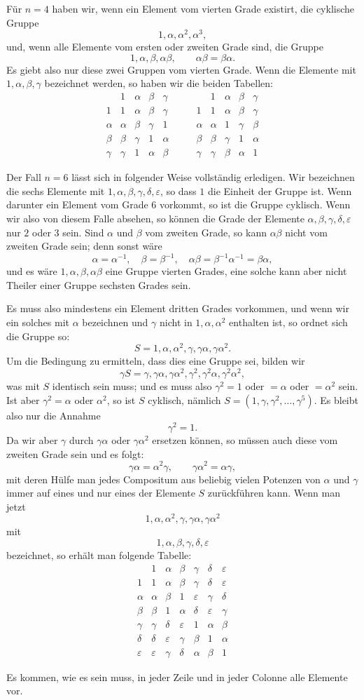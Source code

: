 \documentclass[11pt]{article}
\newcommand{\orderFourTables}{%
\[
\begin{array}{c|cccc}
 &1&\alpha&\beta&\gamma\\\hline
1&1&\alpha&\beta&\gamma\\
\alpha&\alpha&\beta&\gamma&1\\
\beta&\beta&\gamma&1&\alpha\\
\gamma&\gamma&1&\alpha&\beta
\end{array}
\qquad
\begin{array}{c|cccc}
 &1&\alpha&\beta&\gamma\\\hline
1&1&\alpha&\beta&\gamma\\
\alpha&\alpha&1&\gamma&\beta\\
\beta&\beta&\gamma&1&\alpha\\
\gamma&\gamma&\beta&\alpha&1
\end{array}
\]
}
\newcommand{\orderSixTable}{%
\[
\begin{array}{c|cccccc}
&1&\alpha&\beta&\gamma&\delta&\varepsilon\\\hline
1&1&\alpha&\beta&\gamma&\delta&\varepsilon\\
\alpha&\alpha&\beta&1&\varepsilon&\gamma&\delta\\
\beta&\beta&1&\alpha&\delta&\varepsilon&\gamma\\
\gamma&\gamma&\delta&\varepsilon&1&\alpha&\beta\\
\delta&\delta&\varepsilon&\gamma&\beta&1&\alpha\\
\varepsilon&\varepsilon&\gamma&\delta&\alpha&\beta&1
\end{array}
\]
}
\begin{document}
Für $n=4$ haben wir, wenn ein Element vom vierten Grade existirt, die cyklische Gruppe
\[
1,\alpha,\alpha^2,\alpha^3,
\]
und, wenn alle Elemente vom ersten oder zweiten Grade sind, die Gruppe
\[
1,\alpha,\beta,\alpha\beta,
\qquad \alpha\beta=\beta\alpha.
\]
Es giebt also nur diese zwei Gruppen vom vierten Grade. Wenn die Elemente mit $1,\alpha,\beta,\gamma$ bezeichnet werden, so haben wir die beiden Tabellen:
\orderFourTables

Der Fall $n=6$ lässt sich in folgender Weise vollständig erledigen. Wir bezeichnen die sechs Elemente mit $1,\alpha,\beta,\gamma,\delta,\varepsilon$, so dass $1$ die Einheit der Gruppe ist. Wenn darunter ein Element vom Grade $6$ vorkommt, so ist die Gruppe cyklisch. Wenn wir also von diesem Falle absehen, so können die Grade der Elemente $\alpha,\beta,\gamma,\delta,\varepsilon$ nur $2$ oder $3$ sein. Sind $\alpha$ und $\beta$ vom zweiten Grade, so kann $\alpha\beta$ nicht vom zweiten Grade sein; denn sonst wäre
\[
\alpha=\alpha^{-1},\quad \beta=\beta^{-1},\quad \alpha\beta=\beta^{-1}\alpha^{-1}=\beta\alpha,
\]
und es wäre $1,\alpha,\beta,\alpha\beta$ eine Gruppe vierten Grades, eine solche kann aber nicht Theiler einer Gruppe sechsten Grades sein.

Es muss also mindestens ein Element dritten Grades vorkommen, und wenn wir ein solches mit $\alpha$ bezeichnen und $\gamma$ nicht in $1,\alpha,\alpha^2$ enthalten ist, so ordnet sich die Gruppe so:
\begin{equation}
S=1,\alpha,\alpha^2,\gamma,\gamma\alpha,\gamma\alpha^2.
\tag{1}
\end{equation}
Um die Bedingung zu ermitteln, dass dies eine Gruppe sei, bilden wir
\[
\gamma S=\gamma,\gamma\alpha,\gamma\alpha^2,\gamma^2,\gamma^2\alpha,\gamma^2\alpha^2,
\]
was mit $S$ identisch sein muss; und es muss also $\gamma^2=1$ oder $=\alpha$ oder $=\alpha^2$ sein. Ist aber $\gamma^2=\alpha$ oder $\alpha^2$, so ist $S$ cyklisch, nämlich $S=(1,\gamma,\gamma^2,\ldots,\gamma^5)$. Es bleibt also nur die Annahme
\begin{equation}
\gamma^2=1.
\tag{2}
\end{equation}
Da wir aber $\gamma$ durch $\gamma\alpha$ oder $\gamma\alpha^2$ ersetzen können, so müssen auch diese vom zweiten Grade sein und es folgt:
\begin{equation}
\gamma\alpha=\alpha^2\gamma,
\qquad
\gamma\alpha^2=\alpha\gamma,
\tag{3}
\end{equation}
mit deren Hülfe man jedes Compositum aus beliebig vielen Potenzen von $\alpha$ und $\gamma$ immer auf eines und nur eines der Elemente $S$ zurückführen kann. Wenn man jetzt
\[
1,\alpha,\alpha^2,\gamma,\gamma\alpha,\gamma\alpha^2
\]
mit
\[
1,\alpha,\beta,\gamma,\delta,\varepsilon
\]
bezeichnet, so erhält man folgende Tabelle:
\orderSixTable
Es kommen, wie es sein muss, in jeder Zeile und in jeder Colonne alle Elemente vor.
\end{document}
